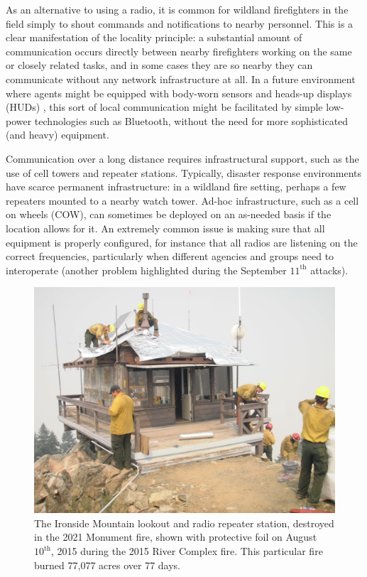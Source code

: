 \documentclass[]             %
{NASA}                       %
\theoremstyle{definition}
\begin{document}
As an alternative to using a radio, it is common for wildland
firefighters in the field simply to shout commands and notifications
to nearby personnel. This is a clear manifestation of the locality
principle: a substantial amount of communication occurs directly
between nearby firefighters working on the same or closely related
tasks, and in some cases they are so nearby they can communicate
without any network infrastructure at all. In a future environment
where agents might be equipped with body-worn sensors and heads-up
displays (HUDs) \citationneeded, this sort of local communication
might be facilitated by simple low-power technologies such as
Bluetooth, without the need for more sophisticated (and heavy)
equipment.

Communication over a long distance requires infrastructural support,
such as the use of cell towers and repeater stations. Typically,
disaster response environments have scarce permanent infrastructure:
in a wildland fire setting, perhaps a few repeaters mounted to a
nearby watch tower. Ad-hoc infrastructure, such as a cell on wheels
(COW), can sometimes be deployed on an as-needed basis if the location
allows for it. An extremely common issue is making sure that all
equipment is properly configured, for instance that all radios are
listening on the correct frequencies, particularly when different
agencies and groups need to interoperate (another problem highlighted
during the September $11^\textrm{th}$ attacks).

\begin{figure}[t]
  \centering
  \includegraphics[scale=0.085]{images/ironside.jpg}
  \caption{The Ironside Mountain lookout and radio repeater station, destroyed in the 2021
    Monument fire, shown with protective foil on August
    $10^\textrm{th}$, 2015 during the 2015 River Complex fire. This
    particular fire burned 77,077 acres over 77 days. \citationneeded}
  \label{fig:ironside}
\end{figure}
\end{document}
